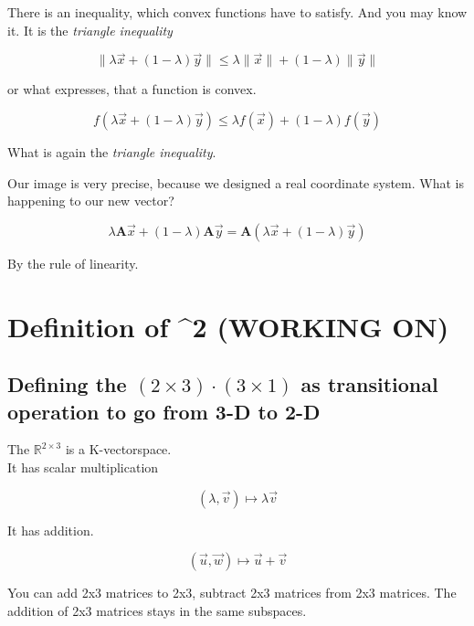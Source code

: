 \documentclass[a4paper]{article}
\begin{document}
\begin{Example}
There is an inequality, which convex functions have to satisfy. And you may know it. It is the \emph{triangle inequality}

\begin{displaymath}
\|\lambda\vec{x} + (1-\lambda)\vec{y}\| \leq \lambda\|\vec{x}\| + (1-\lambda)\|\vec{y}\|
\end{displaymath}

or what expresses, that a function is convex.

\begin{displaymath}
f(\lambda\vec{x} + (1-\lambda)\vec{y}) \leq \lambda f(\vec{x}) + (1-\lambda)f(\vec{y})
\end{displaymath}

What is again the \emph{triangle inequality}.

Our image is very precise, because we designed a real coordinate system. What is happening to our new vector? 

\begin{displaymath}
\lambda\boldsymbol{A}\vec{x} + (1-\lambda)\boldsymbol{A}\vec{y} = \boldsymbol{A}(\lambda\vec{x} + (1-\lambda)\vec{y})
\end{displaymath}

By the rule of linearity.


\section{Definition of ^{2} (WORKING ON)}


\subsection{Defining the $(2\times3)\cdot(3\times1)$ as transitional operation to go from 3-D to 2-D}

The $\mathbb{R}^{2\times3}$ is a K-vectorspace. \\

It has scalar multiplication

\begin{displaymath}
(\lambda, \vec{v}) \mapsto \lambda\vec{v} 
\end{displaymath}

It has addition.

\begin{displaymath}
(\vec{u}, \vec{w}) \mapsto \vec{u} + \vec{v}
\end{displaymath}

You can add 2x3 matrices to 2x3, subtract 2x3 matrices from 2x3 matrices.
The addition of 2x3 matrices stays in the same subspaces.\\


\end{Example}
\end{document}
